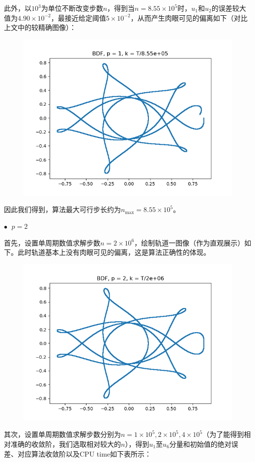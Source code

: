 \documentclass{ctexart}
\begin{document}
\begin{sloppypar}
此外，以$10^3$为单位不断改变步数$n$，得到当$n = 8.55 \times 10^5$时，$u_1$和$u_2$的误差较大值为$4.90 \times 10^{-2}$，最接近给定阈值$5 \times 10^{-2}$，从而产生肉眼可见的偏离如下（对比上文中的较精确图像）：
\begin{figure}[H]
\centering
\includegraphics[scale = 0.45]{./report_src/Figure_57.png}
\end{figure}
因此我们得到，算法最大可行步长约为$n_{\max} = 8.55 \times 10^5$。

$\bullet \;$ $p = 2$

首先，设置单周期数值求解步数$n = 2 \times 10^6$，绘制轨道一图像（作为直观展示）如下。此时轨道基本上没有肉眼可见的偏离，这是算法正确性的体现。
\begin{figure}[H]
\centering
\includegraphics[scale = 0.45]{./report_src/Figure_58.png}
\end{figure}
其次，设置单周期数值求解步数分别为$n = 1 \times 10^5,2 \times 10^5,4 \times 10^5$（为了能得到相对准确的收敛阶，我们选取相对较大的$n$），得到$u_1$至$u_6$分量和初始值的绝对误差、对应算法收敛阶以及CPU time如下表所示：


\end{sloppypar}
\end{document}

